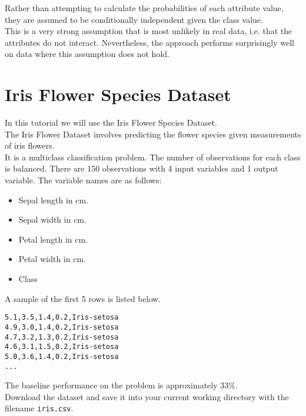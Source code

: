 \documentclass[12pt]{article}
\begin{document}
Rather than attempting to calculate the probabilities of each attribute value, they are assumed to be conditionally independent given the class value.\\

This is a very strong assumption that is most unlikely in real data, i.e. that the attributes do not interact. Nevertheless, the approach performs surprisingly well on data where this assumption does not hold.

\newpage
\section{Iris Flower Species Dataset}

In this tutorial we will use the Iris Flower Species Dataset.\\

The Iris Flower Dataset involves predicting the flower species given measurements of iris flowers.\\

It is a multiclass classification problem. The number of observations for each class is balanced. There are 150 observations with 4 input variables and 1 output variable. The variable names are as follows:\\

\begin{itemize}
	\item Sepal length in cm.
	\item Sepal width in cm.
	\item Petal length in cm.
	\item Petal width in cm.
	\item Class
\end{itemize}

A sample of the first 5 rows is listed below.\\

\begin{lstlisting}
5.1,3.5,1.4,0.2,Iris-setosa
4.9,3.0,1.4,0.2,Iris-setosa
4.7,3.2,1.3,0.2,Iris-setosa
4.6,3.1,1.5,0.2,Iris-setosa
5.0,3.6,1.4,0.2,Iris-setosa
...

\end{lstlisting}

The baseline performance on the problem is approximately $ 33\% $.\\

Download the dataset and save it into your current working directory with the filename \verb|iris.csv|.\\
\end{document}
